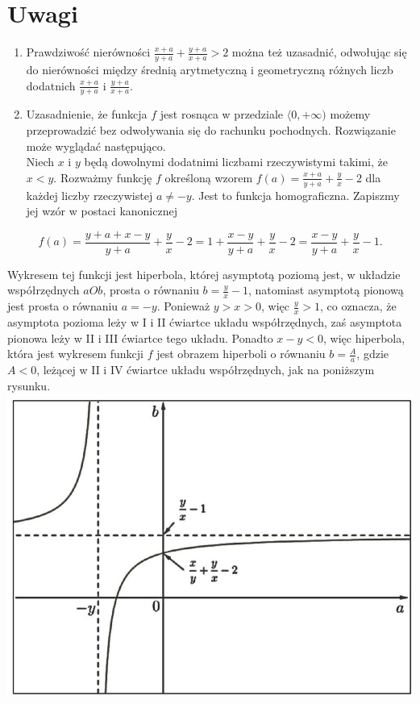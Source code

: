 \documentclass[10pt]{article}
\begin{document}
\section*{Uwagi}
\begin{enumerate}
  \item Prawdziwość nierówności $\frac{x+a}{y+a}+\frac{y+a}{x+a}>2$ można też uzasadnić, odwołując się do nierówności między średnią arytmetyczną i geometryczną różnych liczb dodatnich $\frac{x+a}{y+a}$ i $\frac{y+a}{x+a}$.
  \item Uzasadnienie, że funkcja $f$ jest rosnąca w przedziale $\langle 0,+\infty)$ możemy przeprowadzić bez odwoływania się do rachunku pochodnych. Rozwiązanie może wyglądać następująco.\\
Niech $x$ i $y$ będą dowolnymi dodatnimi liczbami rzeczywistymi takimi, że $x<y$. Rozważmy funkcję $f$ określoną wzorem $f(a)=\frac{x+a}{y+a}+\frac{y}{x}-2$ dla każdej liczby rzeczywistej $a \neq-y$. Jest to funkcja homograficzna. Zapiszmy jej wzór w postaci kanonicznej
\end{enumerate}

$$
f(a)=\frac{y+a+x-y}{y+a}+\frac{y}{x}-2=1+\frac{x-y}{y+a}+\frac{y}{x}-2=\frac{x-y}{y+a}+\frac{y}{x}-1 .
$$

Wykresem tej funkcji jest hiperbola, której asymptotą poziomą jest, w układzie współrzędnych $a O b$, prosta o równaniu $b=\frac{y}{x}-1$, natomiast asymptotą pionową jest prosta o równaniu $a=-y$. Ponieważ $y>x>0$, więc $\frac{y}{x}>1$, co oznacza, że asymptota pozioma leży w I i II ćwiartce układu współrzędnych, zaś asymptota pionowa leży w II i III ćwiartce tego układu. Ponadto $x-y<0$, więc hiperbola, która jest wykresem funkcji $f$ jest obrazem hiperboli o równaniu $b=\frac{A}{a}$, gdzie $A<0$, leżącej w II i IV ćwiartce układu współrzędnych, jak na poniższym rysunku.\\
\includegraphics[max width=\textwidth, center]{2025_02_07_d712b9a47aa2c64928dbg-13}
\end{document}
